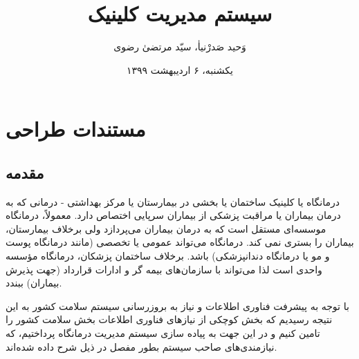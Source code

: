 \documentclass[a4paper,12pt]{report}
\begin{document}
	
	\renewcommand{\bibname}{مراجع}
	\thispagestyle{empty}
	
	\begin{center}
		{
			\qquad{}
		}
	\end{center}
	\title{
		\Title
		سیستم مدیریت کلینیک
	}
	\author{
		\Title
		وَحید صَدرْنیاٰ، سیّد مرتضیٰ رضوی\\
	}
	\date{
		\Title
		یکشنبه، ۶ اردیبهشت ۱۳۹۹
	}
	
	\setcounter{page}{0}
	\maketitle
	\tableofcontents
	\listoffigures

	\chapter{
	مستندات طراحی}
	\section*{
		مقدمه}
	\label{chap13}
	
	درمانگاه یا کلینیک 
	ساختمان یا بخشی در بیمارستان یا مرکز بهداشتی - درمانی که به درمان بیماران یا مراقبت پزشکی از بیماران سرپایی اختصاص دارد. معمولاً، درمانگاه موسسه‌ای مستقل است که به درمان بیماران می‌پردازد ولی برخلاف بیمارستان، بیماران را بستری نمی کند. درمانگاه می‌تواند عمومی یا تخصصی (مانند درمانگاه پوست و مو یا درمانگاه دندانپزشکی) باشد. برخلاف ساختمان پزشکان، درمانگاه مؤسسه واحدی است لذا می‌تواند با سازمان‌های بیمه گر و ادارات قرارداد (جهت پذیرش بیماران) ببندد.
	
	با توجه به پیشرفت فناوری اطلاعات و نیاز به بروزرسانی سیستم سلامت کشور به این نتیجه رسیدیم که بخش کوچکی از نیازهای فناوری اطلاعات بخش سلامت کشور را تامین کنیم و در این جهت به  پیاده سازی سیستم مدیریت درمانگاه پرداختیم، که نیازمندی‌های صاحب سیستم بطور مفصل در ذیل شرح داده شده‌اند.
	
\end{document}
